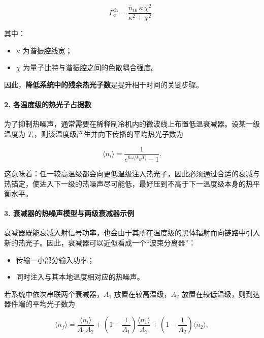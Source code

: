 \documentclass[12pt,a4paper,oneside]{ctexbook}
\begin{document}
\begin{equation}
    \Gamma_{\phi}^{\mathrm{th}}
    =
    \frac{\bar n_{\mathrm{th}}\,\kappa\,\chi^2}{\kappa^2+\chi^2},
    \tag{43}
\end{equation}

其中：

\begin{itemize}
    \item $\kappa$ 为谐振腔线宽；
    \item $\chi$ 为量子比特与谐振腔之间的色散耦合强度。
\end{itemize}

因此，\textbf{降低系统中的残余热光子数}是提升相干时间的关键步骤。

\paragraph{2. 各温度级的热光子占据数}

为了抑制热噪声，通常需要在稀释制冷机内的微波线上布置低温衰减器。设某一级温度为 $T_i$，则该温度级产生并向下传播的平均热光子数为

\begin{equation}
    \langle n_i \rangle
    =
    \frac{1}{e^{\hbar\omega/k_B T_i}-1}.
    \tag{44}
\end{equation}

这意味着：任一较高温级都会向更低温级注入热光子，因此必须通过合适的衰减与热锚定，使进入下一级的热噪声尽可能低，最好压到不高于下一温度级本身的热平衡水平。

\paragraph{3. 衰减器的热噪声模型与两级衰减器示例}

衰减器既能衰减入射信号功率，也会由于其所在温度级的黑体辐射而向链路中引入新的热光子。因此，衰减器可以近似看成一个“波束分离器”：

\begin{itemize}
    \item 传输一小部分输入功率；
    \item 同时注入与其本地温度相对应的热噪声。
\end{itemize}

若系统中依次串联两个衰减器，$A_1$ 放置在较高温级，$A_2$ 放置在较低温级，则到达器件端的平均光子数为

\begin{equation}
    \langle n_f \rangle
    =
    \frac{\langle n_i \rangle}{A_1A_2}
    +
    \left(1-\frac{1}{A_1}\right)\frac{\langle n_1 \rangle}{A_2}
    +
    \left(1-\frac{1}{A_2}\right)\langle n_2 \rangle,
    \tag{45}
\end{equation}
\end{document}
